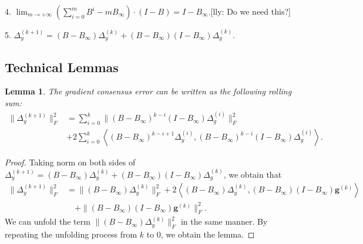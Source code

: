 \documentclass{article}
\newtheorem{lemma}[thm]{Lemma}
\newcommand{\vg}{{\mathbf{g}}}
\newcommand{\norm}[1]{\| #1 \|}
\newcommand{\ip}[1]{\left\langle#1\right\rangle}
\newcommand{\lly}[1]{{\color{red}[lly: #1]}}
\begin{document}
4. $\lim_{m\to+\infty}(\sum_{i=0}^mB^i-mB_{\infty})\cdot (I-B)=I-B_{\infty}$.\lly{Do we need this?} \label{eq:basic_transformation_4}

5. $\Delta_{y}^{(k+1)}=(B-B_{\infty})\Delta_{y}^{(k)}+(B-B_{\infty})(I-B_{\infty})\Delta_{g}^{(k)}$. \label{eq:basic_transformation_5}

\subsection{Technical Lemmas}
\begin{lemma}
The gradient consensus error can be written as the following rolling sum:
\begin{align*}
\norm{\Delta_y^{(k+1)}}_F^2&=\sum_{i=0}^k \norm{(B-B_{\infty})^{k-i}(I-B_{\infty})\Delta_g^{(i)}}_F^2\\
&+2\sum_{i=0}^k \ip{(B-B_{\infty})^{k-i+1}\Delta_y^{(i)}, (B-B_{\infty})^{k-i}(I-B_{\infty})\Delta_g^{(i)}}.
\end{align*}
\end{lemma}
\begin{proof}
  Taking norm on both sides of $\Delta_{y}^{(k+1)}=(B-B_{\infty})\Delta_{y}^{(k)}+(B-B_{\infty})(I-B_{\infty})\Delta_{g}^{(k)}$, we obtain that 
  \begin{align*}
      \norm{\Delta_y^{(k+1)}}_F^2&=\norm{(B-B_\infty)\Delta_y^{(k)}}_F^2+2\ip{(B-B_\infty)\Delta_y^{(k)},(B-B_\infty)(I-B_\infty)\vg^{(k)}}\nonumber \\
      &\quad +\norm{(B-B_\infty)(I-B_\infty)\vg^{(k)}}_F^2.
  \end{align*}
  We can unfold the term $\norm{(B-B_\infty)\Delta_y^{(k)}}_F^2$ in the same manner. By repeating the unfolding process from $k$ to $0$, we obtain the lemma.
\end{proof}
\end{document}
